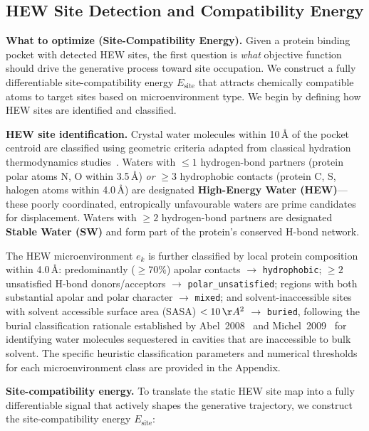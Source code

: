 \documentclass{article}
\begin{document}
\subsection{HEW Site Detection and Compatibility Energy}
\label{sec:hew_energy}

\textbf{What to optimize (Site-Compatibility Energy).}
Given a protein binding pocket with detected HEW sites, the first question is
\emph{what} objective function should drive the generative process toward
site occupation.  We construct a fully differentiable site-compatibility
energy $E_{\text{site}}$ that attracts chemically compatible atoms to target
sites based on microenvironment type.  We begin by defining how HEW sites
are identified and classified.

\textbf{HEW site identification.}
Crystal water molecules within 10\,\AA{} of the pocket centroid are classified
using geometric criteria adapted from classical hydration thermodynamics
studies~\cite{abel2008,michel2009}.  Waters with $\le 1$ hydrogen-bond
partners (protein polar atoms N, O within 3.5\,\AA) \emph{or} $\ge 3$
hydrophobic contacts (protein C, S, halogen atoms within 4.0\,\AA) are
designated \textbf{High-Energy Water (HEW)}---these poorly coordinated,
entropically unfavourable waters are prime candidates for displacement.
Waters with $\ge 2$ hydrogen-bond partners are designated \textbf{Stable Water
(SW)} and form part of the protein's conserved H-bond network.

The HEW microenvironment $e_k$ is further classified by local protein composition
within 4.0\,\AA: predominantly ($\ge 70\%$) apolar contacts $\to$
\texttt{hydrophobic}; $\ge 2$ unsatisfied H-bond donors/acceptors $\to$
\texttt{polar\_unsatisfied}; regions with both substantial apolar and polar
character $\to$ \texttt{mixed}; and solvent-inaccessible sites with solvent
accessible surface area (SASA) $< 10\,\AA^2$ $\to$ \texttt{buried}, following
the burial classification rationale established by Abel~2008~\cite{abel2008}
and Michel~2009~\cite{michel2009} for identifying water molecules sequestered
in cavities that are inaccessible to bulk solvent.  The specific heuristic
classification parameters and numerical thresholds for each microenvironment
class are provided in the Appendix.

\textbf{Site-compatibility energy.}
To translate the static HEW site map into a fully differentiable signal that
actively shapes the generative trajectory, we construct the site-compatibility
energy $E_{\text{site}}$:
\end{document}
